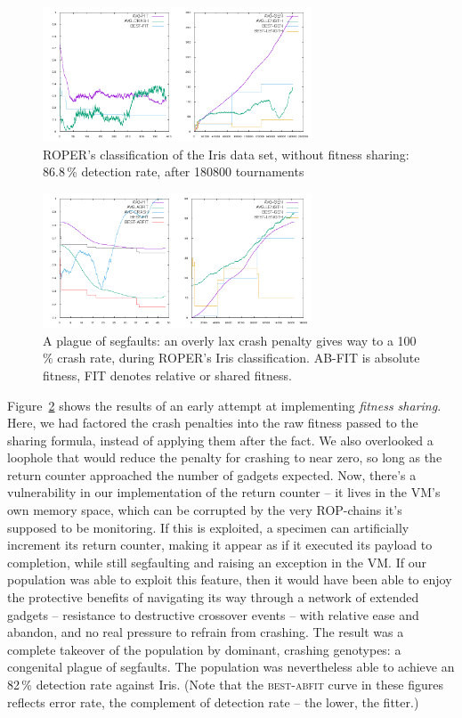 \begin{figure}
  \includegraphics[height=4cm]{examples/iris/good-nosharing/good-nosharing.png}
  \caption{ROPER's classification of the Iris data set, without
  fitness sharing: 86.8\,\% detection rate, after 180800
  tournaments}
  \label{fig:good-nosharing}
\end{figure}

\begin{figure}
  \includegraphics[height=4cm]{examples/iris/plague/plague.png}
  \caption{A plague of segfaults: an overly lax crash penalty
  gives way to a 100\,\% crash rate, during ROPER's Iris
  classification. {AB-FIT} is absolute fitness,
  FIT denotes relative or shared fitness.}
  \label{fig:plague}
\end{figure}

Figure~\ref{fig:plague} shows the results of an early attempt at
implementing \textit{fitness sharing}. Here, we had factored the crash
penalties into the raw fitness passed to the sharing formula,
instead of applying them after the fact. We also overlooked a
loophole that would reduce the penalty for crashing to near zero,
so long as the return counter approached the number of gadgets
expected. Now, there's a vulnerability in our
implementation of the return counter -- it lives in the VM's
own memory space, which can be corrupted by
the very ROP-chains it's supposed to be monitoring. If
this is exploited, a specimen can artificially increment its
return counter, making it appear as if it executed its payload to
completion, while still segfaulting and raising an exception in
the VM. If our population was able to exploit
this feature, then it would have been able to enjoy the
protective benefits of navigating its way through a network of
extended gadgets -- resistance to destructive crossover events --
with relative ease and abandon, and no real pressure to refrain
from crashing. The result was a complete takeover of the
population by dominant, crashing genotypes: a congenital plague of
segfaults. The population was nevertheless able to achieve an 82\,\%
detection rate against Iris. (Note that the \textsc{best-abfit} curve in these
figures reflects error rate, the complement of detection rate -- the
lower, the fitter.)

